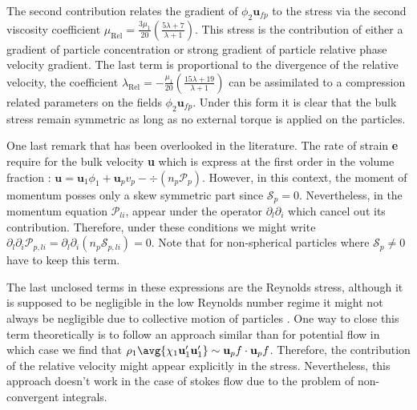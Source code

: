 The second contribution relates the gradient of $\phi_2 \textbf{u}_{fp}$ to the stress via the second viscosity coefficient $\mu_\text{Rel} = \frac{3 \mu_1 }{20}\left(\frac{5\lambda+7}{\lambda+1}\right)$.
This stress is the contribution of either a gradient of particle concentration or strong gradient of particle relative phase velocity gradient. 
The last term is proportional to the divergence of the relative velocity, the coefficient $\lambda_\text{Rel}= - \frac{\mu_1}{20}\left(\frac{15\lambda+19}{\lambda+1}\right)$ can be assimilated to a compression related parameters on the fields $\phi_2\textbf{u}_{fp}$. 
Under this form it is clear that the bulk stress remain symmetric as long as no external torque is applied on the particles. 

One last remark that has been overlooked in the literature. 
The rate of strain \textbf{e} require for the bulk velocity \textbf{u} which is express at the first order in the volume fraction : $\textbf{u} = \textbf{u}_1 \phi_1 + \textbf{u}_pv_p - \div(n_p \mathcal{P}_p)$.
However, in this context, the moment of momentum  posses only a skew symmetric part since $\mathcal{S}_p = 0$. 
Nevertheless, in the momentum equation $\mathcal{P}_{li}$, appear under the operator $\partial_l\partial_i$ which cancel out its contribution. 
Therefore, under these conditions we might write $\partial_l\partial_i \mathcal{P}_{p,li} = \partial_l\partial_i (n_p \mathcal{S}_{p,li}) = 0$. 
Note that for non-spherical particles where $\mathcal{S}_p \neq 0$ have to keep this term. 

The last unclosed terms in these expressions are the Reynolds stress, although it is supposed to be negligible in the low Reynolds number regime it might not always be negligible due to collective motion of particles \citet{zhang1997momentum}. 
One way to close this term theoretically is to follow an approach similar than \citet{van1982bubble} for potential flow in which case we find that $\rho_1\avg{\chi_1\textbf{u}_1'\textbf{u}_1'} \sim \textbf{u}_pf\cdot \textbf{u}_pf$.
Therefore, the contribution of the relative velocity might appear explicitly in the stress. 
Nevertheless, this approach doesn't work in the case of stokes flow due to the problem of non-convergent integrals. 